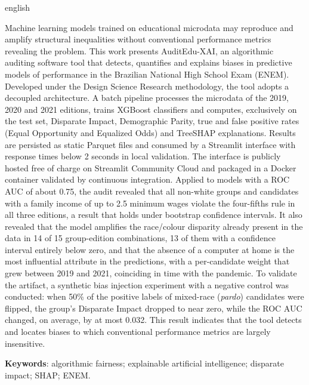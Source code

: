 \begin{resumo}[Abstract]
 \begin{otherlanguage*}{english}

Machine learning models trained on educational microdata may reproduce and amplify structural inequalities without conventional performance metrics revealing the problem. This work presents AuditEdu-XAI, an algorithmic auditing software tool that detects, quantifies and explains biases in predictive models of performance in the Brazilian National High School Exam (ENEM). Developed under the Design Science Research methodology, the tool adopts a decoupled architecture. A batch pipeline processes the microdata of the 2019, 2020 and 2021 editions, trains XGBoost classifiers and computes, exclusively on the test set, Disparate Impact, Demographic Parity, true and false positive rates (Equal Opportunity and Equalized Odds) and TreeSHAP explanations. Results are persisted as static Parquet files and consumed by a Streamlit interface with response times below 2 seconds in local validation. The interface is publicly hosted free of charge on Streamlit Community Cloud and packaged in a Docker container validated by continuous integration. Applied to models with a ROC AUC of about 0.75, the audit revealed that all non-white groups and candidates with a family income of up to 2.5 minimum wages violate the four-fifths rule in all three editions, a result that holds under bootstrap confidence intervals. It also revealed that the model amplifies the race/colour disparity already present in the data in 14 of 15 group-edition combinations, 13 of them with a confidence interval entirely below zero, and that the absence of a computer at home is the most influential attribute in the predictions, with a per-candidate weight that grew between 2019 and 2021, coinciding in time with the pandemic. To validate the artifact, a synthetic bias injection experiment with a negative control was conducted: when 50\% of the positive labels of mixed-race (\textit{pardo}) candidates were flipped, the group's Disparate Impact dropped to near zero, while the ROC AUC changed, on average, by at most 0.032. This result indicates that the tool detects and locates biases to which conventional performance metrics are largely insensitive.

   \vspace{\onelineskip}

   \noindent
   \textbf{Keywords}: algorithmic fairness; explain\-able artificial intelligence; disparate impact; SHAP; ENEM.
 \end{otherlanguage*}
\end{resumo}
